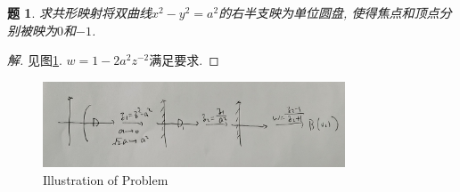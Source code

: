 \documentclass{article}[a4paper, 12pt]
\newtheorem{problem}{题}
\newenvironment{solution}{\begin{proof}[解]}{\end{proof}}
\begin{document}
\begin{problem}
  求共形映射将双曲线\(x^2-y^2=a^2\)的右半支映为单位圆盘, 使得焦点和顶点分别被映为\(0\)和\(-1\).
\end{problem}

\begin{solution}
  见图\ref{fig:supp1}. \(w=1-2a^2z^{-2}\)满足要求.
\end{solution}

\begin{figure}[htbp]
  \centering
  \includegraphics[width=0.8\textwidth]{images/supp1.jpg}
  \caption{Illustration of Problem}
  \label{fig:supp1}
\end{figure}
\end{document}
